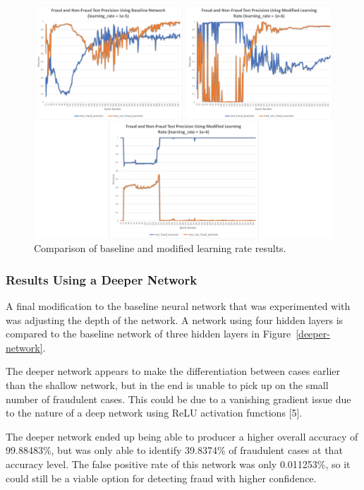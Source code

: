 \documentclass{article}
\begin{document}
\begin{figure}
  \begin{center}
    \includegraphics[width=135mm]{ModifiedLearningRate.pdf}
    \caption{Comparison of baseline and modified learning rate results.}
    \label{learning-rate}
  \end{center}
\end{figure}

\subsubsection{Results Using a Deeper Network}

A final modification to the baseline neural network that was experimented with was adjusting
 the depth of the network. A network using four hidden layers is compared to the baseline
 network of three hidden layers in Figure~\ref{deeper-network}. 

 The deeper network appears to make the differentiation between cases earlier than the
 shallow network, but in the end is unable to pick up on the small number of fraudulent cases.
 This could be due to a vanishing gradient issue due to the nature of a deep network using ReLU
 activation functions [5].

The deeper network ended up being able to producer a higher overall accuracy of 99.88483\%,
 but was only able to identify 39.8374\% of fraudulent cases at that accuracy level. The false
 positive rate of this network was only 0.011253\%, so it could still be a viable
 option for detecting fraud with higher confidence.
\end{document}
